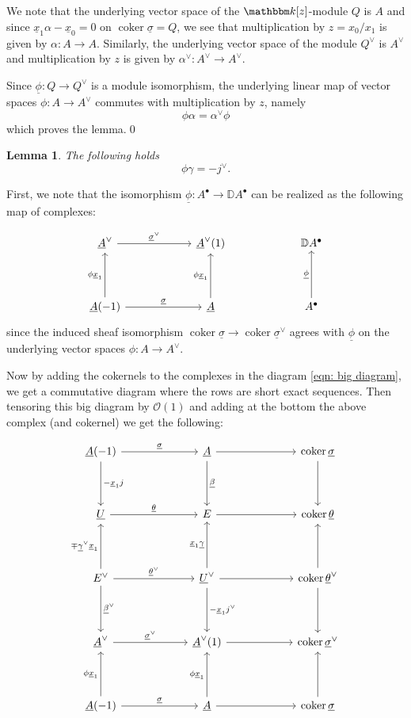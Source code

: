 \documentclass{amsart}
\newtheorem{lemma}[theorem]{Lemma}
\theoremstyle{definition}
\newcommand{\DD} {{\mathbb D}}
\newcommand{\kk} {{\mathbbm k}}
\newcommand{\OO}{\mathcal{O}}
\newcommand{\coker}{\operatorname{coker}}
\newcommand{\UL}[1]{\underline{#1}}
\begin{document}
We note that the underlying vector space of the $\kk [z]$-module $Q$ is
$A$ and since $\UL{x}_{1}\alpha -\UL{x}_{0}=0$ on $\coker
\UL{\sigma}=Q$, we see that multiplication by $z=x_{0}/x_{1}$ is given
by $\alpha :A\to A$. Similarly, the underlying vector space of the
module $Q^{\vee}$ is $A^{\vee}$ and multiplication by $z$ is given by
$\alpha^{\vee}:A^{\vee}\to A^{\vee}$.

Since $\UL{\phi}:Q\to Q^{\vee}$ is a module isomorphism, the
underlying linear map of vector spaces $\phi :A\to A^{\vee}$ commutes
with multiplication by $z$, namely
\[
\phi \alpha =\alpha^{\vee}\phi 
\]
which proves the lemma.\qed 

\begin{lemma}\label{lem: phi.gamma = -jvee}
The following holds
\[
\phi \gamma =-j^{\vee}.
\]
\end{lemma}
\proof
First, we note that the isomorphism $\UL{\phi}:A^{\bullet}\to \DD
A^{\bullet}$ can be realized as the following map of complexes:

\[
\begin{tikzcd}[column sep=6em,row sep=4em]
  \UL{A}^{\vee }
    \arrow[r,"\UL{\sigma}^{\vee}"]
  & \UL{A}^{\vee}(1)
  & \DD A^{\bullet }
  \\
  \UL{A}(-1)
    \arrow[r,"\UL{\sigma  }"]
    \arrow[u,"\phi \UL{x}_{1}"]
  & \UL{A}
    \arrow[u,"\phi \UL{x}_{1}"]
  & A^{\bullet}
    \arrow[u,"\UL{\phi } "]
\end{tikzcd}
\]
since the induced sheaf isomorphism $\coker \UL{\sigma}\to \coker
\UL{\sigma}^{\vee}$ agrees with $\UL{\phi}$ on the underlying vector
spaces $\phi :A\to A^{\vee}$.

Now by adding the cokernels to the complexes in the diagram
\eqref{eqn: big diagram}, we get a commutative diagram where the rows
are short exact sequences. Then tensoring this big diagram by $\OO
(1)$ and adding at the bottom the above complex (and cokernel) we get the
following:

\begin{equation*}
\begin{tikzcd}[column sep=6em,row sep=4em]
  \UL{A}(-1)
    \arrow[d,"-\UL{x}_{1}j"]
    \arrow[r,"\UL{\sigma  }"]
  & \UL{A}
    \arrow[d,"\UL{\beta }"]
    \arrow[r]
  & \coker \UL{\sigma }
    \arrow[d]
  \\
  \UL{U}
    \arrow[r,"\UL{\theta }"]
  & E
    \arrow[r]
  & \coker \UL{\theta }
  \\
  E^{\vee}
    \arrow[d,"\UL{\beta}^{\vee}"]
    \arrow[u,"\mp \UL{\gamma}^{\vee}\UL{x}_{1}"]
    \arrow[r,"\UL{\theta }^{\vee}"]
  & \UL{U}^{\vee }
    \arrow[r]
    \arrow[d,"-\UL{x}_{1}j^{\vee}"]
    \arrow[u,"\UL{x}_{1}\UL{\gamma }"]
  & \coker \UL{\theta}^{\vee}
    \arrow[d]
    \arrow[u]
  \\
    \UL{A}^{\vee} 
    \arrow[r,"\UL{\sigma  }^{\vee}"]
  & \UL{A}^{\vee}(1)
    \arrow[r]
  & \coker \UL{\sigma}^{\vee}
  \\
  \UL{A}(-1)
    \arrow[u,"\phi \UL{x}_{1}"]
    \arrow[r,"\UL{\sigma  }"]
  & \UL{A}
    \arrow[u,"\phi \UL{x}_{1}"]
    \arrow[r]
  & \coker \UL{\sigma }
    \arrow[u]    
\end{tikzcd}
\end{equation*}
\end{document}
